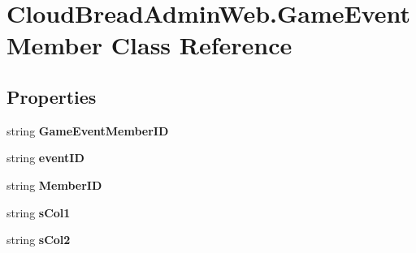 \hypertarget{class_cloud_bread_admin_web_1_1_game_event_member}{}\section{Cloud\+Bread\+Admin\+Web.\+Game\+Event\+Member Class Reference}
\label{class_cloud_bread_admin_web_1_1_game_event_member}
\subsection*{Properties}
\begin{DoxyCompactItemize}
\item 
string {\bfseries Game\+Event\+Member\+ID}\hypertarget{class_cloud_bread_admin_web_1_1_game_event_member_a651d1629ec9958bbd1c33f4c4e6c97d4}{}\label{class_cloud_bread_admin_web_1_1_game_event_member_a651d1629ec9958bbd1c33f4c4e6c97d4}

\item 
string {\bfseries event\+ID}\hypertarget{class_cloud_bread_admin_web_1_1_game_event_member_a574e5d67df647eba163c9a1bc319c77f}{}\label{class_cloud_bread_admin_web_1_1_game_event_member_a574e5d67df647eba163c9a1bc319c77f}

\item 
string {\bfseries Member\+ID}\hypertarget{class_cloud_bread_admin_web_1_1_game_event_member_a085b6a4f56c6ed2ec95fd1c35bf34d67}{}\label{class_cloud_bread_admin_web_1_1_game_event_member_a085b6a4f56c6ed2ec95fd1c35bf34d67}

\item 
string {\bfseries s\+Col1}\hypertarget{class_cloud_bread_admin_web_1_1_game_event_member_aaeb96916c15c51b0ad086f9f38550bc6}{}\label{class_cloud_bread_admin_web_1_1_game_event_member_aaeb96916c15c51b0ad086f9f38550bc6}

\item 
string {\bfseries s\+Col2}\hypertarget{class_cloud_bread_admin_web_1_1_game_event_member_ac755b234cb5cba0faab04ed6ffe236f8}{}\label{class_cloud_bread_admin_web_1_1_game_event_member_ac755b234cb5cba0faab04ed6ffe236f8}


\end{DoxyCompactItemize}
